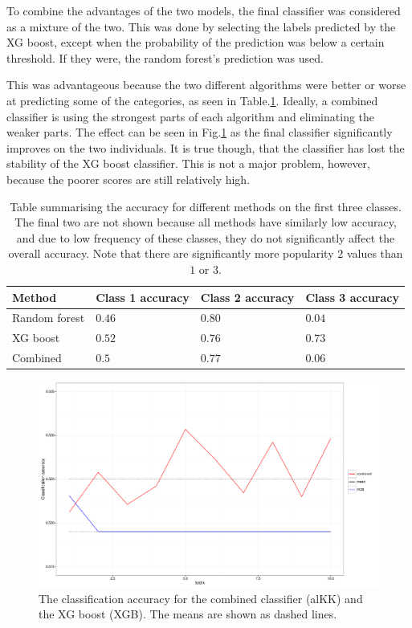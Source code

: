 \documentclass[onecolumn,prl,aps,10pt]{revtex4}
\begin{document}
To combine the advantages of the two models, the final classifier was considered as a mixture of the two. This was done by selecting the labels predicted by the XG boost, except when the probability of the prediction was below a certain threshold. If they were, the random forest's prediction was used.

This was advantageous because the two different algorithms were better or worse at predicting some of the categories, as seen in Table.\ref{cattable}. Ideally, a combined classifier is using the strongest parts of each algorithm and eliminating the weaker parts. The effect can be seen in Fig.\ref{compgraph} as the final classifier significantly improves on the two individuals. It is true though, that the classifier has lost the stability of the XG boost classifier. This is not a major problem, however, because the poorer scores are still relatively high.

\begin{table}[h]
\begin{tabular}{|l|l|l|l|}
\hline\textbf{}
Method & Class 1 accuracy & Class 2 accuracy & Class 3 accuracy \\ \hline
Random forest & $0.46$ & $0.80$ & $0.04$ \\ \hline
XG boost & $0.52$ & $0.76$ & $0.73$ \\ \hline
Combined & $0.5$ & $0.77$ & $0.06$ \\ \hline
\end{tabular}
\caption{Table summarising the accuracy for different methods on the first three classes. The final two are not shown because all methods have similarly low accuracy, and due to low frequency of these classes, they do not significantly affect the overall accuracy. Note that there are significantly more popularity $2$ values than $1$ or $3 $.}\label{cattable}
\end{table} 

\begin{figure}
\includegraphics*[height=0.4\linewidth , width=0.8\linewidth,clip]{combxgb.pdf}
\caption{The classification accuracy for the combined classifier (alKK) and the XG boost (XGB). The means are shown as dashed lines.} \label{compgraph}
\end{figure}
\end{document}
